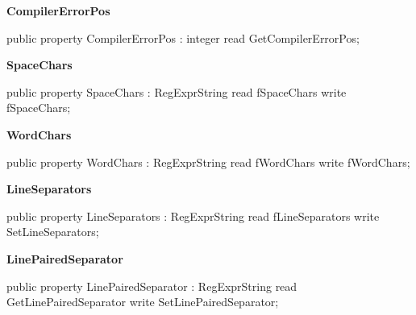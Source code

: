 \documentclass{report}
\newif\ifpdf
\begin{document}
\begin{list}{}
\begin{flushleft}
\ifpdf
\end{flushleft}
\fi


\par  \label{RegExpr.TRegExpr-CompilerErrorPos}
\item[\textbf{CompilerErrorPos}\hfill]
\ifpdf
\begin{flushleft}
\fi
\begin{ttfamily}
public property CompilerErrorPos : integer read GetCompilerErrorPos;\end{ttfamily}

\ifpdf
\end{flushleft}
\fi


\par  \label{RegExpr.TRegExpr-SpaceChars}
\item[\textbf{SpaceChars}\hfill]
\ifpdf
\begin{flushleft}
\fi
\begin{ttfamily}
public property SpaceChars : RegExprString read fSpaceChars write fSpaceChars;\end{ttfamily}

\ifpdf
\end{flushleft}
\fi


\par  \label{RegExpr.TRegExpr-WordChars}
\item[\textbf{WordChars}\hfill]
\ifpdf
\begin{flushleft}
\fi
\begin{ttfamily}
public property WordChars : RegExprString read fWordChars write fWordChars;\end{ttfamily}

\ifpdf
\end{flushleft}
\fi


\par  \label{RegExpr.TRegExpr-LineSeparators}
\item[\textbf{LineSeparators}\hfill]
\ifpdf
\begin{flushleft}
\fi
\begin{ttfamily}
public property LineSeparators : RegExprString read fLineSeparators write SetLineSeparators;\end{ttfamily}

\ifpdf
\end{flushleft}
\fi


\par  \label{RegExpr.TRegExpr-LinePairedSeparator}
\item[\textbf{LinePairedSeparator}\hfill]
\ifpdf
\begin{flushleft}
\fi
\begin{ttfamily}
public property LinePairedSeparator : RegExprString read GetLinePairedSeparator write SetLinePairedSeparator;\end{ttfamily}


\end{flushleft}
\end{list}
\end{document}
